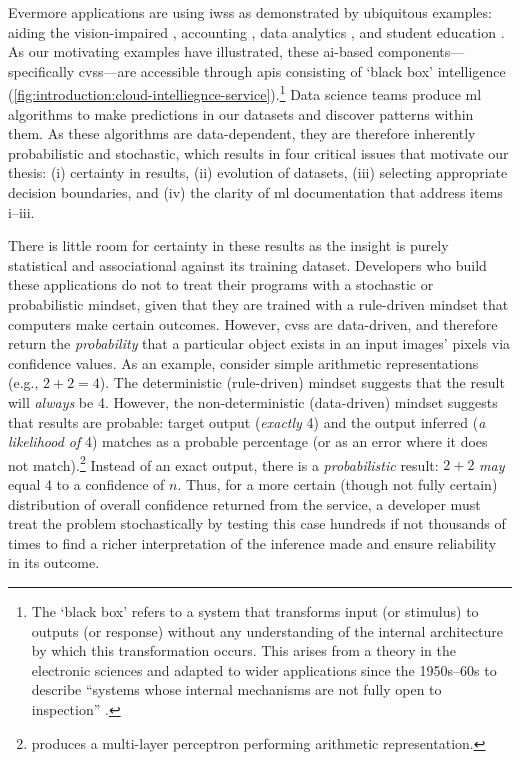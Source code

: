\newcontent
Evermore applications are using \glspl{iws} as demonstrated by ubiquitous examples: aiding the vision-impaired \citep{Reis:2018cp,daMotaSilveira:2017vp}, accounting  \citep{Marshall:2018uj}, data analytics \citep{Iyengar:2017fb}, and student education \citep{Dibia:2017iy}.
As our motivating examples have illustrated, these \gls{ai}-based components---specifically \glspl{cvs}---are accessible through \glspl{api} consisting of `black box' intelligence (\cref{fig:introduction:cloud-intelliegnce-service}).\footnote{The `black box' refers to a system that transforms input (or stimulus)  to outputs (or response) without any understanding of the internal architecture by which this transformation occurs. This arises from a theory in the electronic sciences and adapted to wider applications since the 1950s--60s \citep{Ashby:1957db,Bunge:1963jm} to describe ``systems whose internal mechanisms are not fully open to inspection'' \citep{Ashby:1957db}. }
Data science teams produce \gls{ml} algorithms to make predictions in our datasets and discover patterns within them. As these algorithms are data-dependent, they are therefore inherently probabilistic and stochastic, which results in four critical issues that motivate our thesis: (i) certainty in results, (ii) evolution of datasets, (iii) selecting appropriate decision boundaries, and (iv) the clarity of \gls{ml} documentation that address items i--iii.

There is little room for certainty in these results as the insight is purely statistical and associational \citep{Pearl:2018uv} against its training dataset. Developers who build these applications do not to treat their programs with a stochastic or probabilistic mindset, given that they are trained with a rule-driven mindset that computers make certain outcomes. 
However, \glspl{cvs} are data-driven, and therefore return the \textit{probability} that a particular object exists in an input images' pixels via confidence values.
As an example, consider simple arithmetic representations (e.g., $2+2=4$). The deterministic (rule-driven) mindset suggests that the result will \textit{always} be 4. However, the non-deterministic (data-driven) mindset suggests that results are probable: target output (\textit{exactly} 4) and the output inferred (\textit{a likelihood of} 4) matches as a probable percentage (or as an error where it does not match).\footnote{\citet{Blake:1998vd} produces a multi-layer perceptron  performing arithmetic representation.} Instead of an exact output, there is a \textit{probabilistic} result: $2+2$ \textit{may} equal 4 to a confidence of $n$. 
Thus, for a more certain (though not fully certain) distribution of overall confidence returned from the service, a developer must treat the problem stochastically by testing this case hundreds if not thousands of times to find a richer interpretation of the inference made and ensure reliability in its outcome.


